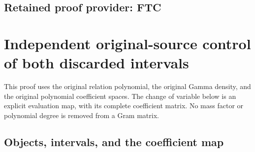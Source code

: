 \documentclass[11pt,a4paper]{article}
\begin{document}

\clearpage
\subsection*{Retained proof provider: FTC}

\section{Independent original-source control of both discarded intervals}

This proof uses the original relation polynomial, the original Gamma density,
and the original polynomial coefficient spaces.  The change of variable below
is an explicit evaluation map, with its complete coefficient matrix.  No
mass factor or polynomial degree is removed from a Gram matrix.

\subsection{Objects, intervals, and the coefficient map}
\end{document}

